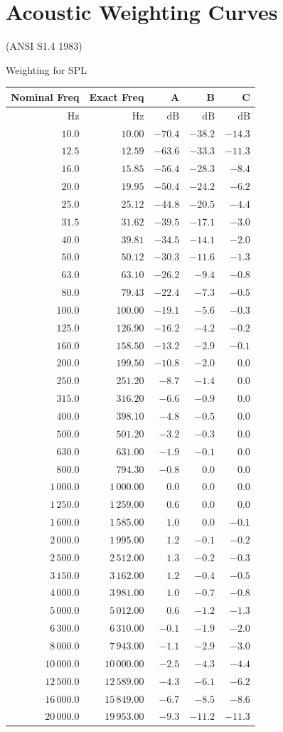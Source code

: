 \documentclass[
]{book}
\begin{document}
\hypertarget{acoustic-weighting-curves}{%
\section{Acoustic Weighting Curves}\label{acoustic-weighting-curves}}

(ANSI S1.4 1983)

Weighting for SPL

\begin{longtable}[]{@{}rrrrr@{}}
\toprule
Nominal Freq & Exact Freq & A & B & C\tabularnewline
\midrule
\endhead
\(\text{Hz}\) & \(\text{Hz}\) & \(\text{dB}\) & \(\text{dB}\) & \(\text{dB}\)\tabularnewline
\(10.0\) & \(10.00\) & \(-70.4\) & \(-38.2\) & \(-14.3\)\tabularnewline
\(12.5\) & \(12.59\) & \(-63.6\) & \(-33.3\) & \(-11.3\)\tabularnewline
\(16.0\) & \(15.85\) & \(-56.4\) & \(-28.3\) & \(-8.4\)\tabularnewline
\(20.0\) & \(19.95\) & \(-50.4\) & \(-24.2\) & \(-6.2\)\tabularnewline
\(25.0\) & \(25.12\) & \(-44.8\) & \(-20.5\) & \(-4.4\)\tabularnewline
\(31.5\) & \(31.62\) & \(-39.5\) & \(-17.1\) & \(-3.0\)\tabularnewline
\(40.0\) & \(39.81\) & \(-34.5\) & \(-14.1\) & \(-2.0\)\tabularnewline
\(50.0\) & \(50.12\) & \(-30.3\) & \(-11.6\) & \(-1.3\)\tabularnewline
\(63.0\) & \(63.10\) & \(-26.2\) & \(-9.4\) & \(-0.8\)\tabularnewline
\(80.0\) & \(79.43\) & \(-22.4\) & \(-7.3\) & \(-0.5\)\tabularnewline
\(100.0\) & \(100.00\) & \(-19.1\) & \(-5.6\) & \(-0.3\)\tabularnewline
\(125.0\) & \(126.90\) & \(-16.2\) & \(-4.2\) & \(-0.2\)\tabularnewline
\(160.0\) & \(158.50\) & \(-13.2\) & \(-2.9\) & \(-0.1\)\tabularnewline
\(200.0\) & \(199.50\) & \(-10.8\) & \(-2.0\) & \(0.0\)\tabularnewline
\(250.0\) & \(251.20\) & \(-8.7\) & \(-1.4\) & \(0.0\)\tabularnewline
\(315.0\) & \(316.20\) & \(-6.6\) & \(-0.9\) & \(0.0\)\tabularnewline
\(400.0\) & \(398.10\) & \(-4.8\) & \(-0.5\) & \(0.0\)\tabularnewline
\(500.0\) & \(501.20\) & \(-3.2\) & \(-0.3\) & \(0.0\)\tabularnewline
\(630.0\) & \(631.00\) & \(-1.9\) & \(-0.1\) & \(0.0\)\tabularnewline
\(800.0\) & \(794.30\) & \(-0.8\) & \(0.0\) & \(0.0\)\tabularnewline
\(1\,000.0\) & \(1\,000.00\) & \(0.0\) & \(0.0\) & \(0.0\)\tabularnewline
\(1\,250.0\) & \(1\,259.00\) & \(0.6\) & \(0.0\) & \(0.0\)\tabularnewline
\(1\,600.0\) & \(1\,585.00\) & \(1.0\) & \(0.0\) & \(-0.1\)\tabularnewline
\(2\,000.0\) & \(1\,995.00\) & \(1.2\) & \(-0.1\) & \(-0.2\)\tabularnewline
\(2\,500.0\) & \(2\,512.00\) & \(1.3\) & \(-0.2\) & \(-0.3\)\tabularnewline
\(3\,150.0\) & \(3\,162.00\) & \(1.2\) & \(-0.4\) & \(-0.5\)\tabularnewline
\(4\,000.0\) & \(3\,981.00\) & \(1.0\) & \(-0.7\) & \(-0.8\)\tabularnewline
\(5\,000.0\) & \(5\,012.00\) & \(0.6\) & \(-1.2\) & \(-1.3\)\tabularnewline
\(6\,300.0\) & \(6\,310.00\) & \(-0.1\) & \(-1.9\) & \(-2.0\)\tabularnewline
\(8\,000.0\) & \(7\,943.00\) & \(-1.1\) & \(-2.9\) & \(-3.0\)\tabularnewline
\(10\,000.0\) & \(10\,000.00\) & \(-2.5\) & \(-4.3\) & \(-4.4\)\tabularnewline
\(12\,500.0\) & \(12\,589.00\) & \(-4.3\) & \(-6.1\) & \(-6.2\)\tabularnewline
\(16\,000.0\) & \(15\,849.00\) & \(-6.7\) & \(-8.5\) & \(-8.6\)\tabularnewline
\(20\,000.0\) & \(19\,953.00\) & \(-9.3\) & \(-11.2\) & \(-11.3\)\tabularnewline
\bottomrule
\end{longtable}
\end{document}
